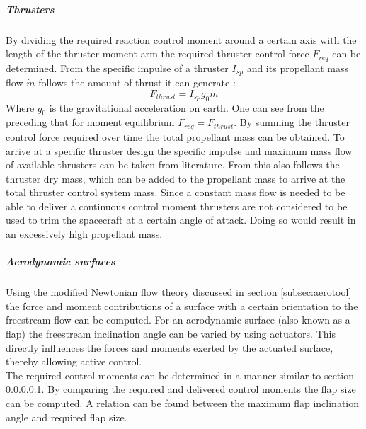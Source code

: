 \subparagraph{Thrusters}
\label{subpar:thrusters}
By dividing the required reaction control moment around a certain axis with the length of the thruster moment arm the required thruster control force $F_{req}$ can be determined. From the specific impulse of a thruster $I_{sp}$ and its propellant mass flow $\dot{m}$ follows the amount of thrust it can generate \cite{Allen2012}:
\begin{equation}
F_{thrust}=I_{sp}g_{0}\dot{m}
\label{eq:Fthrust}
\end{equation}
Where $g_{0}$ is the gravitational acceleration on earth. One can see from the preceding that for moment equilibrium $F_{req}=F_{thrust}$. By summing the thruster control force required over time the total propellant mass can be obtained. To arrive at a specific thruster design the specific impulse and maximum mass flow of available thrusters can be taken from literature. From this also follows the thruster dry mass, which can be added to the propellant mass to arrive at the total thruster control system mass.
Since a constant mass flow is needed to be able to deliver a continuous control moment thrusters are not considered to be used to trim the spacecraft at a certain angle of attack. Doing so would result in an excessively high propellant mass.
\subparagraph{Aerodynamic surfaces}
Using the modified Newtonian flow theory discussed in section \ref{subsec:aerotool} the force and moment contributions of a surface with a certain orientation to the freestream flow can be computed. For an aerodynamic surface (also known as a flap) the freestream inclination angle can be varied by using actuators. This directly influences the forces and moments exerted by the actuated surface, thereby allowing active control.\\
The required control moments can be determined in a manner similar to section \ref{subpar:thrusters}. By comparing the required and delivered control moments the flap size can be computed. A relation can be found between the maximum flap inclination angle and required flap size. 